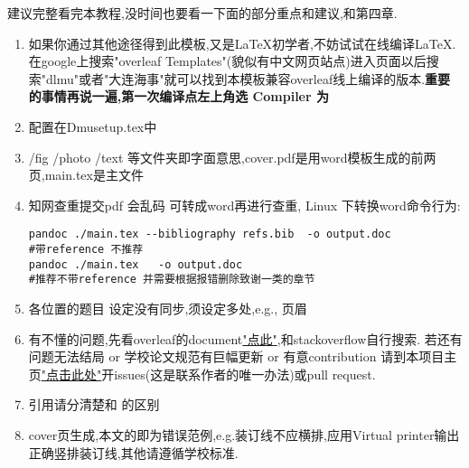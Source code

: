 建议完整看完本教程,没时间也要看一下面的部分重点和建议,和第四章.
\begin{enumerate}
    \item 如果你通过其他途径得到此模板,又是\LaTeX 初学者,不妨试试在线编译\LaTeX . 在google上搜索"overleaf Templates"(貌似有中文网页站点)进入页面以后搜索"dlmu"或者"大连海事"就可以找到本模板兼容overleaf线上编译的版本.\textbf{重要的事情再说一遍,第一次编译点左上角选 Compiler 为 \XeLaTeX }
    \item 配置在Dmusetup.tex中 
    \item /fig /photo /text 等文件夹即字面意思,cover.pdf是用word模板生成的前两页,main.tex是主文件
    \item 知网查重提交pdf 会乱码 可转成word再进行查重, Linux 下转换word命令行为: 
    \begin{lstlisting}
pandoc ./main.tex --bibliography refs.bib  -o output.doc
#带reference 不推荐
pandoc ./main.tex   -o output.doc 
#推荐不带reference 并需要根据报错删除致谢一类的章节
  \end{lstlisting}
  \item 各位置的题目 设定没有同步,须设定多处,e.g., 页眉
  \item 有不懂的问题,先看overleaf的document\href{https://www.overleaf.com/learn}{"点此"},和stackoverflow自行搜索. 若还有问题无法结局 or 学校论文规范有巨幅更新 or 有意contribution 请到本项目主页\href{https://github.com/XWEster97/DLMU-Bachelor-Thesis-Template}{"点击此处"}开issues(这是联系作者的唯一办法)或pull request.
  \item 引用请分清楚\cite{hart_initializing_2012}和 的区别
  \item cover页生成,本文的即为错误范例,e.g.装订线不应横排,应用Virtual printer输出正确竖排装订线,其他请遵循学校标准.
\end{enumerate}

 





